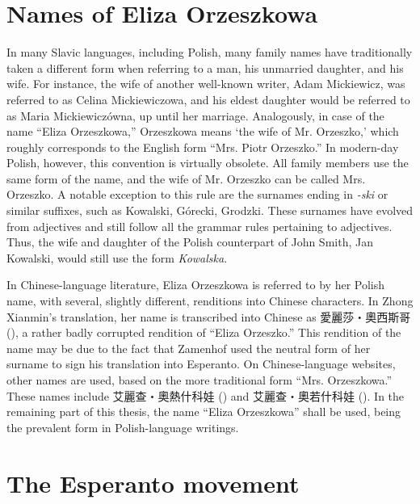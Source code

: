 \section{Names of Eliza Orzeszkowa}
In many Slavic languages, including Polish, many family names have traditionally taken a different form when referring to a man, his unmarried daughter, and his wife.
For instance, the wife of another well-known writer, Adam Mickiewicz, was referred to as Celina Mickiewiczowa, and his eldest daughter would be referred to as Maria Mickiewiczówna, up until her marriage.
Analogously, in case of the name ``Eliza Orzeszkowa,'' Orzeszkowa means `the wife of Mr. Orzeszko,' which roughly corresponds to the English form ``Mrs. Piotr Orzeszko.''
In modern-day Polish, however, this convention is virtually obsolete.
All family members use the same form of the name, and the wife of Mr. Orzeszko can be called Mrs. Orzeszko.
A notable exception to this rule are the surnames ending in \textit{-ski} or similar suffixes, such as Kowalski, Górecki, Grodzki.
These surnames have evolved from adjectives and still follow all the grammar rules pertaining to adjectives.
Thus, the wife and daughter of the Polish counterpart of John Smith, Jan Kowalski, would still use the form \textit{Kowalska}. 

In Chinese-language literature, Eliza Orzeszkowa is referred to by her Polish name, with several, slightly different, renditions into Chinese characters.
In Zhong Xianmin's translation, her name is transcribed into Chinese as 愛麗莎・奧西斯哥 (), a rather badly corrupted rendition of ``Eliza Orzeszko.''
This rendition of the name may be due to the fact that Zamenhof used the neutral form of her surname to sign his translation into Esperanto.
On Chinese-language websites, other names are used, based on the more traditional form ``Mrs. Orzeszkowa.'' These names include 艾麗查・奧熱什科娃 () and 艾麗查・奧若什科娃 (). In the remaining part of this thesis, the name ``Eliza Orzeszkowa'' shall be used, being the prevalent form in Polish-language writings.

\section{The Esperanto movement}